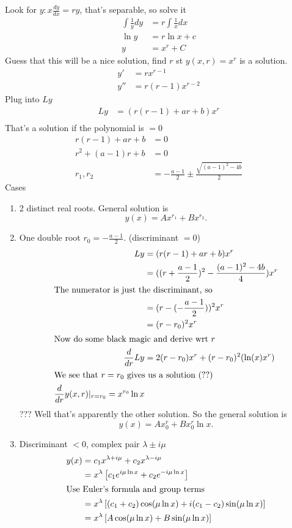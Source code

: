 \documentclass{article}
\begin{document}
Look for $y: x \frac{dy}{dx} = ry$, that's separable, so solve it
\begin{align}
	\int \frac{1}{y} dy &= r \int \frac{1}{x} dx \\
	\ln y &= r \ln x + c \\
	y &= x^r + C
\end{align}
Guess that this will be a nice solution, find $r$ st $y(x,r) = x^r$ is a solution.
\begin{align}
	y' &= rx^{r-1} \\
	y'' &= r(r-1)x^{r-2}
\end{align}
Plug into $Ly$
\begin{align}
	Ly &= (r(r-1) + ar + b) x^r \\
\end{align}
That's a solution if the polynomial is $= 0$
\begin{align}
	r(r-1) + ar + b &= 0 \\
	r^2 + (a-1)r + b &= 0 \\
	r_1, r_2 &= -\frac{a-1}{2} \pm \frac{\sqrt{(a-1)^2 - 4b}}{2} 
\end{align}
Cases
\begin{enumerate}
	\item 2 distinct real roots. General solution is \[
			y(x) = Ax^{r_1} + Bx^{r_2}
	.\] 
\item One double root $r_0 = -\frac{a-1}{2}$. (discriminant $= 0$)
	\begin{align}
		Ly &= (r(r-1) + ar + b)x^r \\
		   &= ((r+\frac{a-1}{2})^2 - \frac{(a-1)^2 - 4b}{4})x^r \\
		   \intertext{The numerator is just the discriminant, so}
		   &= (r - (-\frac{a-1}{2}))^2x^r \\
		   &= (r-r_0)^2x^r \\
		   \intertext{Now do some black magic and derive wrt $r$}
		\frac{d}{dr} Ly &= 2(r-r_0)x^r + (r-r_0)^2(\ln(x) x^r) \\
		\intertext{We see that $r=r_0$ gives us a solution (??)}
		\frac{d}{dr} y(x,r) |_{r=r_0} = x^{r_0}\ln x 
	\end{align}
	??? Well that's apparently the other solution. So the general solution is
	\[
		y(x) = Ax^r_0 + Bx^r_0 \ln x
	.\]
\item Discriminant $< 0$, complex pair $\lambda \pm i\mu$
	\begin{align}
		y(x) &= c_1x^{\lambda +i\mu} + c_2x^{\lambda-i\mu} \\
		     &= x^\lambda \left[ c_1e^{i\mu\ln x} + c_2e^{-i\mu\ln x}\right] \\
		     \intertext{Use Euler's formula and group terms}
		     &= x^\lambda\left[ (c_1+c_2) \cos(\mu\ln x) + i(c_1-c_2)\sin(\mu\ln x) \right] \\
                     &= x^\lambda\left[ A \cos(\mu\ln x) + B\sin(\mu\ln x) \right]
	\end{align}
\end{enumerate}
\end{document}
